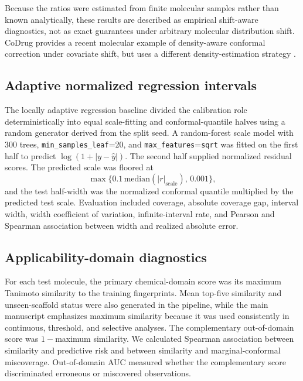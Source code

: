 Because the ratios were estimated from finite molecular samples rather than known analytically, these results are described as empirical shift-aware diagnostics, not as exact guarantees under arbitrary molecular distribution shift. CoDrug provides a recent molecular example of density-aware conformal correction under covariate shift, but uses a different density-estimation strategy \citep{laghuvarapu2023codrug}.

\subsection{Adaptive normalized regression intervals}

The locally adaptive regression baseline divided the calibration role deterministically into equal scale-fitting and conformal-quantile halves using a random generator derived from the split seed. A random-forest scale model with 300 trees, \texttt{min\_samples\_leaf}=20, and \texttt{max\_features}=\texttt{sqrt} was fitted on the first half to predict $\log(1+|y-\widehat{y}|)$. The second half supplied normalized residual scores. The predicted scale was floored at
\begin{equation}
  \max\{0.1\,\mathrm{median}(|r|_{\mathrm{scale}}),\,0.001\},
\end{equation}
and the test half-width was the normalized conformal quantile multiplied by the predicted test scale. Evaluation included coverage, absolute coverage gap, interval width, width coefficient of variation, infinite-interval rate, and Pearson and Spearman association between width and realized absolute error.

\subsection{Applicability-domain diagnostics}

For each test molecule, the primary chemical-domain score was its maximum Tanimoto similarity to the training fingerprints. Mean top-five similarity and unseen-scaffold status were also generated in the pipeline, while the main manuscript emphasizes maximum similarity because it was used consistently in continuous, threshold, and selective analyses. The complementary out-of-domain score was $1-$maximum similarity. We calculated Spearman association between similarity and predictive risk and between similarity and marginal-conformal miscoverage. Out-of-domain AUC measured whether the complementary score discriminated erroneous or miscovered observations.

